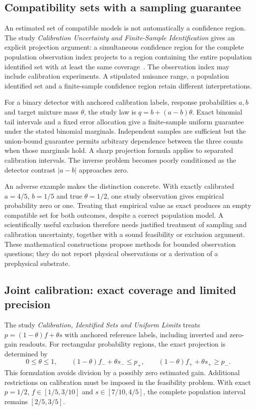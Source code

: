 \subsection{Compatibility sets with a sampling guarantee}

An estimated set of compatible models is not automatically a confidence region. The study \emph{Calibration Uncertainty and Finite-Sample Identification} gives an explicit projection argument: a simultaneous confidence region for the complete population observation index projects to a region containing the entire population identified set with at least the same coverage~\cite{justusCalibration}. The observation index may include calibration experiments. A stipulated nuisance range, a population identified set and a finite-sample confidence region retain different interpretations.

For a binary detector with anchored calibration labels, response probabilities $a,b$ and target mixture mass $\theta$, the study law is $q=b+(a-b)\theta$. Exact binomial tail intervals and a fixed error allocation give a finite-sample uniform guarantee under the stated binomial marginals. Independent samples are sufficient but the union-bound guarantee permits arbitrary dependence between the three counts when those marginals hold. A sharp projection formula applies to separated calibration intervals. The inverse problem becomes poorly conditioned as the detector contrast $|a-b|$ approaches zero.

An adverse example makes the distinction concrete. With exactly calibrated $a=4/5$, $b=1/5$ and true $\theta=1/2$, one study observation gives empirical probability zero or one. Treating that empirical value as exact produces an empty compatible set for both outcomes, despite a correct population model. A scientifically useful exclusion therefore needs justified treatment of sampling and calibration uncertainty, together with a sound feasibility or exclusion argument. These mathematical constructions propose methods for bounded observation questions; they do not report physical observations or a derivation of a prephysical substrate.

\subsection{Joint calibration: exact coverage and limited precision}

The study \emph{Calibration, Identified Sets and Uniform Limits} treats $p=(1-\theta)f+\theta s$ with anchored reference labels, including inverted and zero-gain readouts. For rectangular probability regions, the exact projection is determined by
\[
 0\le\theta\le1,\qquad
 (1-\theta)f_-+\theta s_-\le p_+,\qquad
 (1-\theta)f_++\theta s_+\ge p_-.
\]
This formulation avoids division by a possibly zero estimated gain. Additional restrictions on calibration must be imposed in the feasibility problem. With exact $p=1/2$, $f\in[1/5,3/10]$ and $s\in[7/10,4/5]$, the complete population interval remains $[2/5,3/5]$.

